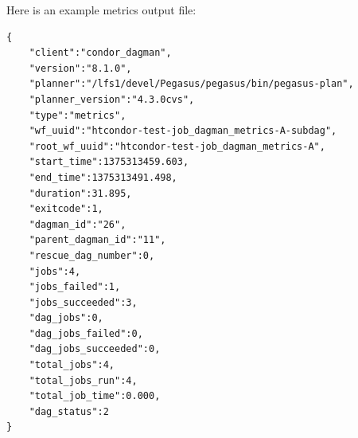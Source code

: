 Here is an example metrics output file:
\begin{verbatim} 
{
    "client":"condor_dagman",
    "version":"8.1.0",
    "planner":"/lfs1/devel/Pegasus/pegasus/bin/pegasus-plan",
    "planner_version":"4.3.0cvs",
    "type":"metrics",
    "wf_uuid":"htcondor-test-job_dagman_metrics-A-subdag",
    "root_wf_uuid":"htcondor-test-job_dagman_metrics-A",
    "start_time":1375313459.603,
    "end_time":1375313491.498,
    "duration":31.895,
    "exitcode":1,
    "dagman_id":"26",
    "parent_dagman_id":"11",
    "rescue_dag_number":0,
    "jobs":4,
    "jobs_failed":1,
    "jobs_succeeded":3,
    "dag_jobs":0,
    "dag_jobs_failed":0,
    "dag_jobs_succeeded":0,
    "total_jobs":4,
    "total_jobs_run":4,
    "total_job_time":0.000,
    "dag_status":2
}
\end{verbatim} 

